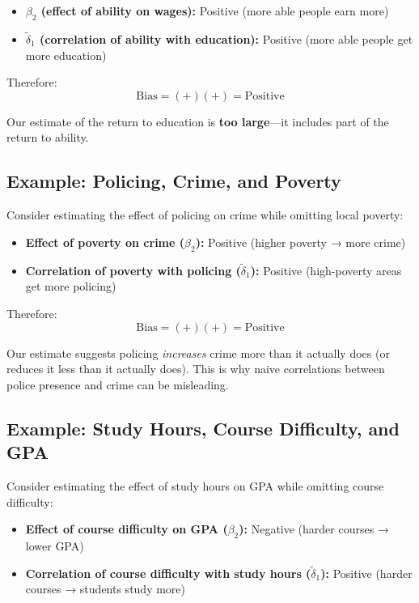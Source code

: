\documentclass[
  letterpaper,
  DIV=11,
  numbers=noendperiod]{scrreprt}
\providecommand{\tightlist}{%
  \setlength{\itemsep}{0pt}\setlength{\parskip}{0pt}}
\begin{document}
\begin{itemize}
\tightlist
\item
  \textbf{\(\beta_2\) (effect of ability on wages):} Positive (more able
  people earn more)
\item
  \textbf{\(\tilde{\delta}_1\) (correlation of ability with education):}
  Positive (more able people get more education)
\end{itemize}

Therefore: \[\text{Bias} = (+)(+) = \text{Positive}\]

Our estimate of the return to education is \textbf{too large}---it
includes part of the return to ability.

\subsection{Example: Policing, Crime, and
Poverty}\label{example-policing-crime-and-poverty}

Consider estimating the effect of policing on crime while omitting local
poverty:

\begin{itemize}
\tightlist
\item
  \textbf{Effect of poverty on crime (\(\beta_2\)):} Positive (higher
  poverty → more crime)
\item
  \textbf{Correlation of poverty with policing (\(\tilde{\delta}_1\)):}
  Positive (high-poverty areas get more policing)
\end{itemize}

Therefore: \[\text{Bias} = (+)(+) = \text{Positive}\]

Our estimate suggests policing \emph{increases} crime more than it
actually does (or reduces it less than it actually does). This is why
naive correlations between police presence and crime can be misleading.

\subsection{Example: Study Hours, Course Difficulty, and
GPA}\label{example-study-hours-course-difficulty-and-gpa}

Consider estimating the effect of study hours on GPA while omitting
course difficulty:

\begin{itemize}
\tightlist
\item
  \textbf{Effect of course difficulty on GPA (\(\beta_2\)):} Negative
  (harder courses → lower GPA)
\item
  \textbf{Correlation of course difficulty with study hours
  (\(\tilde{\delta}_1\)):} Positive (harder courses → students study
  more)
\end{itemize}
\end{document}
